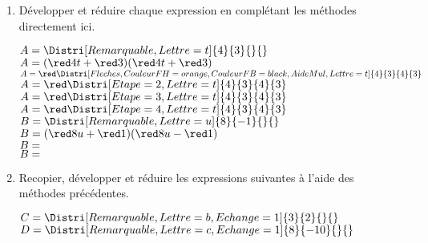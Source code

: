\begin{corrige}
    \begin{enumerate}
        \item Développer et réduire chaque expression en complétant les méthodes directement ici.\\
        \begin{itemize}
            \def\item{}
            \begin{spacing}{1.2}
                \item $A=\Distri[Remarquable,Lettre=t]{4}{3}{}{}$\\
                $A=({\red 4t}+{\red 3})({\red 4t}+{\red 3})$\\\bigskip
                $A={\red \Distri[Fleches,CouleurFH=orange,CouleurFB=black,AideMul,Lettre=t]{4}{3}{4}{3}}$\\\bigskip
                $A={\red \Distri[Etape=2,Lettre=t]{4}{3}{4}{3}}$\\
                $A={\red \Distri[Etape=3,Lettre=t]{4}{3}{4}{3}}$\\
                $A={\red \Distri[Etape=4,Lettre=t]{4}{3}{4}{3}}$\\\medskip
                \item $B=\Distri[Remarquable,Lettre=u]{8}{-1}{}{}$\\
                $B=({\red 8u}+{\red 1})({\red 8u}-{\red 1})$\\
                $B=\dotfill$\\
                $B=\dotfill$
            \end{spacing}
        \end{itemize}
        \item Recopier, développer et réduire les expressions suivantes à l'aide des méthodes précédentes.\\
        \begin{itemize}
            \def\item{}
            \begin{spacing}{1.2}
                \item $C=\Distri[Remarquable,Lettre=b,Echange=1]{3}{2}{}{}$
                \item $D=\Distri[Remarquable,Lettre=c,Echange=1]{8}{-10}{}{}$
            \end{spacing}
        \end{itemize}    
    \end{enumerate}
\end{corrige}

